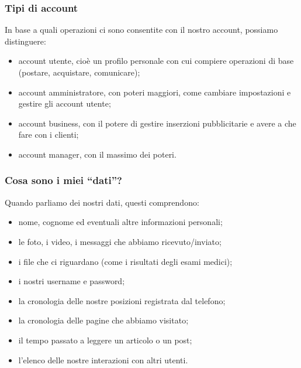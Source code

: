 \documentclass[handout]{beamer}
\begin{document}
\begin{frame}
\frametitle{Tipi di account}
In base a quali operazioni ci sono consentite con il nostro account, possiamo distinguere:
\begin{itemize}
  \item \alert{account utente}, cioè un profilo personale con cui compiere operazioni di base (postare, acquistare, comunicare);\pause
  \item \alert{account amministratore}, con poteri maggiori, come cambiare impostazioni e gestire gli account utente;\pause
  \item \alert{account business}, con il potere di gestire inserzioni pubblicitarie e avere a che fare con i clienti;\pause
  \item \alert{account manager}, con il massimo dei poteri.
\end{itemize}
\end{frame}



\begin{frame}
\frametitle{Cosa sono i miei ``dati''?}
Quando parliamo dei nostri dati, questi comprendono:
\begin{itemize}
  \item nome, cognome ed eventuali altre informazioni personali;\pause
  \item le foto, i video, i messaggi che abbiamo ricevuto/inviato;\pause
  \item i file che ci riguardano (come i risultati degli esami medici);\pause
  \item i nostri username e password;\pause
  \item la cronologia delle nostre posizioni registrata dal telefono;\pause
  \item la cronologia delle pagine che abbiamo visitato;\pause
  \item il tempo passato a leggere un articolo o un post;\pause
  \item l'elenco delle nostre interazioni con altri utenti.
\end{itemize} 
\end{frame}
\end{document}
